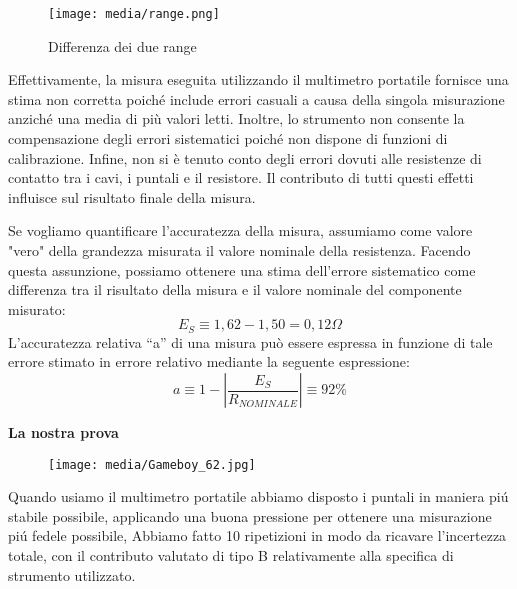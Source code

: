 \begin{figure}[h]
    \centering
    \texttt{[image: media/range.png]}
    \caption{Differenza dei due range}
    \label{fig:range}
\end{figure}

Effettivamente, la misura eseguita utilizzando il multimetro portatile fornisce una stima non corretta poiché include errori casuali a causa della singola misurazione anziché una media di più valori letti. Inoltre, lo strumento non consente la compensazione degli errori sistematici poiché non dispone di funzioni di calibrazione. Infine, non si è tenuto conto degli errori dovuti alle resistenze di contatto tra i cavi, i puntali e il resistore. Il contributo di tutti questi effetti influisce sul risultato finale della misura.

Se vogliamo quantificare l'accuratezza della misura, assumiamo come valore "vero" della grandezza misurata il valore nominale della resistenza. Facendo questa assunzione, possiamo ottenere una stima dell'errore sistematico come differenza tra il risultato della misura e il valore nominale del componente misurato:
\begin{equation}
    E_S \equiv 1,62 - 1,50 = 0,12\Omega
\end{equation}
L’accuratezza relativa “a” di una misura può essere espressa in funzione di tale errore 
stimato in errore relativo mediante la seguente espressione: 
\begin{equation}
     a \equiv 1 - \left| \frac{E_S}{R_{NOMINALE}}\right| \equiv 92\%
\end{equation}


\textbf{La nostra prova}


\begin{figure}[h]
    \centering
    \texttt{[image: media/Gameboy\_62.jpg]}
    \label{fig:mult_port_nostro}
\end{figure}

Quando usiamo il multimetro portatile abbiamo disposto i puntali in maniera pi\'u stabile possibile, applicando una buona pressione per ottenere una misurazione pi\'u fedele possibile,
Abbiamo fatto 10 ripetizioni in modo da ricavare l'incertezza totale, con il contributo valutato di tipo B relativamente alla specifica di strumento utilizzato.


